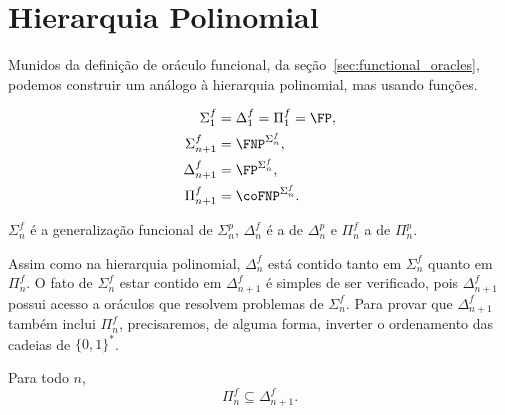 \section{Hierarquia Polinomial}

Munidos da definição de oráculo funcional,
da seção~\ref{sec:functional_oracles},
podemos construir um análogo à hierarquia polinomial,
mas usando funções.

\begin{definition}
    \begin{align*}
        \Sigma_1^f &= \Delta_1^f = \Pi_1^f = \FP, \\
        \Sigma_{n+1}^f &= \FNP^{\Sigma_n^f}, \\
        \Delta_{n+1}^f &= \FP^{\Sigma_n^f}, \\
        \Pi_{n+1}^f &= \coFNP^{\Sigma_n^f}.
    \end{align*}
\end{definition}

$\Sigma_n^f$ é a generalização funcional de $\Sigma_n^p$,
$\Delta_n^f$ é a de $\Delta_n^p$
e $\Pi_n^f$ a de $\Pi_n^p$.

Assim como na hierarquia polinomial,
$\Delta_n^f$ está contido tanto em $\Sigma_n^f$ quanto em $\Pi_n^f$.
O fato de $\Sigma_n^f$ estar contido em $\Delta_{n+1}^f$
é simples de ser verificado,
pois $\Delta_{n+1}^f$ possui acesso a oráculos
que resolvem problemas de $\Sigma_n^f$.
Para provar que $\Delta_{n+1}^f$ também inclui $\Pi_n^f$,
precisaremos, de alguma forma,
inverter o ordenamento das cadeias de $\{0, 1\}^*$.

\begin{proposition}
    Para todo $n$,
    \begin{equation*}
        \Pi_n^f \subseteq \Delta_{n+1}^f.
    \end{equation*}
\end{proposition}

